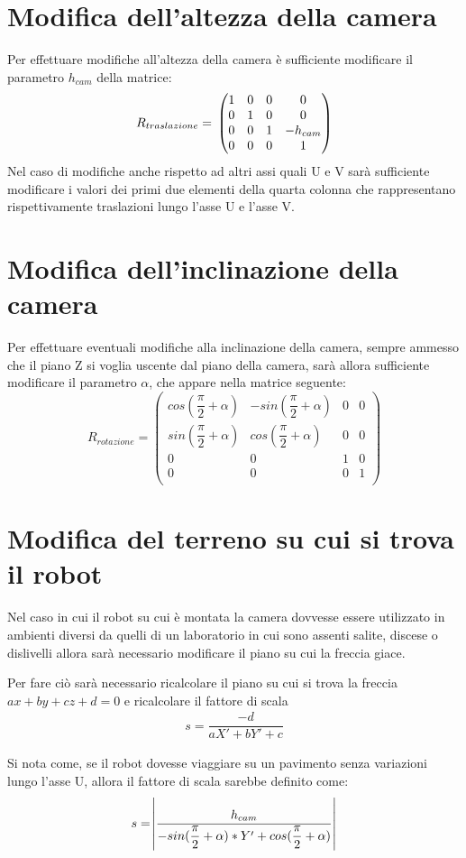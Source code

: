\section{Modifica dell'altezza della camera}
Per effettuare modifiche all'altezza della camera è sufficiente modificare il parametro $h_{cam}$ della matrice:
\begin{equation}
	R_{traslazione} = \\
	\begin{pmatrix}
	1 & 0 & 0 & 0 \\
	0 & 1 & 0 & 0 \\
	0 & 0 & 1 & -h_{cam}\\
	0 & 0 & 0 & 1 \\
	\end{pmatrix}
\end{equation}
Nel caso di modifiche anche rispetto ad altri assi quali U e V sarà sufficiente modificare i valori dei primi due elementi della quarta colonna che rappresentano rispettivamente traslazioni lungo l'asse U e l'asse V.

\section{Modifica dell'inclinazione della camera}
Per effettuare eventuali modifiche alla inclinazione della camera, sempre ammesso che il piano Z si voglia uscente dal piano della camera, sarà allora sufficiente modificare il parametro $\alpha$, che appare nella matrice seguente:
\begin{equation}
	R_{rotazione} =
	\begin{pmatrix}
		cos(\dfrac{\pi}{2}+\alpha) & -sin(\dfrac{\pi}{2}+\alpha) & 0 & 0 \\
		sin(\dfrac{\pi}{2}+\alpha) & cos(\dfrac{\pi}{2}+\alpha)& 0 & 0 \\
		0 & 0 & 1 & 0 \\
		0 & 0 & 0 & 1 \\
	\end{pmatrix}
\end{equation}

\section{Modifica del terreno su cui si trova il robot}
Nel caso in cui il robot su cui è montata la camera dovvesse essere utilizzato in ambienti diversi da quelli di un laboratorio in cui sono assenti salite, discese o dislivelli allora sarà necessario modificare il piano su cui la freccia giace.

Per fare ciò sarà necessario ricalcolare il piano su cui si trova la freccia $ax+by+cz+d=0$ e ricalcolare il fattore di scala
\begin{equation}
	\begin{split}
	s = \dfrac{-d}{aX'+bY'+c}	
	\end{split}
\end{equation}

Si nota come, se il robot dovesse viaggiare su un pavimento senza variazioni lungo l'asse U, allora il fattore di scala sarebbe definito come:
$$
s = \abs{\dfrac{h_{cam}
	}{-sin(\dfrac{\pi}{2}+\alpha)*Y'+ cos(\dfrac{\pi}{2}+\alpha)}}
$$
